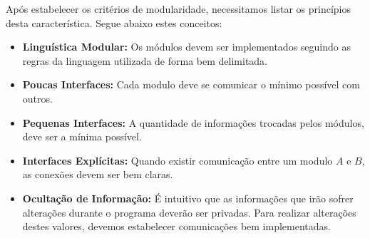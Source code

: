 \documentclass[a4paper, 12pt]{article}
\begin{document}
		Após estabelecer os critérios de modularidade, necessitamos listar os princípios desta característica. Segue abaixo estes conceitos:
		
		\begin{itemize}
			\item \textbf{Linguística Modular:} Os módulos devem ser implementados seguindo as regras da linguagem utilizada de forma bem delimitada.
			
			\item \textbf{Poucas Interfaces:} Cada modulo deve se comunicar o mínimo possível com outros.
			
			\item \textbf{Pequenas Interfaces:} A quantidade de informações trocadas pelos módulos, deve ser a mínima possível.
			
			\item \textbf{Interfaces Explícitas:} Quando existir comunicação entre um modulo $A$ e $B$, as conexões devem ser bem claras.
			
			\item \textbf{Ocultação de Informação:} É intuitivo que as informações que irão sofrer alterações durante o programa deverão ser privadas. Para realizar alterações destes valores, devemos estabelecer comunicações bem implementadas.
		\end{itemize}
		
	\nocite{*}
	\printbibliography
		
\end{document}
